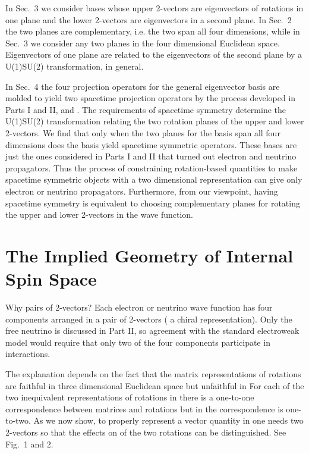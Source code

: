 \documentclass[a4paper,12pt]{article}
\begin{document}
	In Sec.~3 we consider bases whose upper 2-vectors are eigenvectors of rotations in one plane and the lower 2-vectors are eigenvectors in a second plane. In Sec.~2 the two planes are complementary, i.e. the two span all four dimensions, while in Sec.~3 we consider any two planes in the four dimensional Euclidean space. Eigenvectors of one plane are related to the eigenvectors of the second plane by a U(1)\myHighlight{$\times$}\coordHE{}SU(2) transformation, in general. 

	In Sec.~4 the four projection operators for the general eigenvector basis are molded to yield two spacetime projection operators by the process developed in Parts I and II, \cite{partI} and \cite{partII}. The requirements of spacetime symmetry determine the U(1)\myHighlight{$\times$}\coordHE{}SU(2) transformation relating the two rotation planes of the upper and lower 2-vectors. We find that only when the two planes for the basis span all four dimensions does the basis yield spacetime symmetric operators. These bases are just the ones considered in Parts I and II that turned out electron and neutrino propagators. Thus the process of constraining rotation-based quantities to make spacetime symmetric objects with a two dimensional representation can give only electron or neutrino propagators. Furthermore, from our viewpoint, having spacetime symmetry is equivalent to choosing complementary planes for rotating the upper and lower 2-vectors in the wave function.



\section{The Implied Geometry of Internal Spin Space} \label{geometry} 

	Why pairs of 2-vectors? Each electron or neutrino wave function has four components arranged in a pair of 2-vectors ( a chiral representation). Only the free neutrino is discussed in Part II, so agreement with the standard electroweak model would require that only two of the four components participate in interactions. 

	The explanation depends on the fact that the \coordHE{} matrix representations of rotations are faithful in three dimensional Euclidean space \coordHE{} but unfaithful in \coordHE{} For each of the two inequivalent representations of rotations in \coordHE{} there is a one-to-one correspondence between matrices and rotations but in \coordHE{} the correspondence is one-to-two. As we now show, to properly represent a vector quantity \myHighlight{$\chi$}\coordHE{} in \coordHE{} one needs two 2-vectors so that the effects on \myHighlight{$\chi$}\coordHE{} of the two rotations can be distinguished. See Fig.~1 and 2. 
\end{document}
